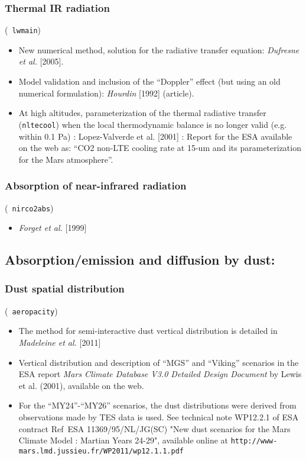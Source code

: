 \subsubsection*{Thermal IR radiation} (\verb+ lwmain+)
\begin{itemize}
\item New numerical method, solution for the radiative transfer equation:
{\it Dufresne et al.} [2005]. 
\item Model validation and inclusion of the ``Doppler'' effect
(but using an old numerical formulation):
{\it Hourdin} [1992] (article).
\nocite{Hour:92,Hour:00b,Dufr:05}

\item At high altitudes, parameterization of the thermal radiative transfer
({\tt nltecool}) when the local thermodynamic balance is no longer valid
(e.g. within 0.1 Pa) : Lopez-Valverde et al. [2001] :
Report for the ESA available on the web
as: ``CO2 non-LTE cooling rate at
15-um and its parameterization for the Mars atmosphere''.

\end{itemize}

\subsubsection*{Absorption of near-infrared radiation}
 (\verb+ nirco2abs+)
\begin{itemize}
\item {\it Forget et al.} [1999]
\end{itemize}

\subsection{\bf Absorption/emission and diffusion by dust:}

\subsubsection*{Dust spatial distribution}
 (\verb+ aeropacity+)

\begin{itemize}
\item The method for semi-interactive dust vertical distribution
is detailed in {\it Madeleine et al.} [2011]
\item Vertical distribution and description of ``MGS'' and ``Viking'' scenarios
in the ESA report {\it Mars Climate Database V3.0 Detailed Design Document}
by Lewis et al. (2001), available on the web.
\item For the ``MY24''-``MY26'' scenarios, the dust distributions were
derived from observations made by
TES data is used. See technical note WP12.2.1 of ESA contract
Ref~ESA 11369/95/NL/JG(SC) "New dust scenarios for the Mars Climate Model : Martian Years
24-29", available online at
\verb+http://www-mars.lmd.jussieu.fr/WP2011/wp12.1.1.pdf+

\end{itemize}
\nocite{Lewi:99,Made:11}

